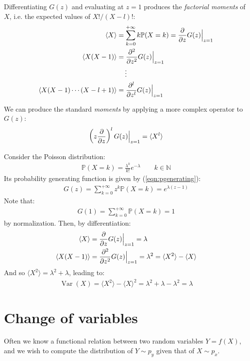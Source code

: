 \documentclass[../template.tex]{subfiles}
\begin{document}
Differentiating $G(z)$ and evaluating at $z=1$ produces the \textit{factorial moments} of $X$, i.e. the expected values of $X!/(X-l)!$:
\begin{align*}
    \langle X \rangle &= \sum_{k=0}^{+\infty} k \mathbb{P}(X=k) = \pdv{z} G(z)\Big|_{z=1} \\
    \langle X(X-1) \rangle &= \pdv[2]{z} G(z)\Big|_{z =1}\\
    \vdots \span\\
    \langle X(X-1)\cdots (X-l+1) \rangle &= \pdv[l]{z} G(z)\Big|_{z=1}
\end{align*} 

We can produce the standard \textit{moments} by applying a more complex operator to $G(z)$:
\begin{align*}
    \left(z \pdv{z}\right)^l G(z) \Big|_{z=1} = \langle X^l \rangle
\end{align*} 

\begin{example}
    Consider the Poisson distribution:
    \begin{align*}
        \mathbb{P}(X=k) = \frac{\lambda^k}{k!} e^{-\lambda} \qquad k \in \mathbb{N} 
    \end{align*}
    Its probability generating function is given by (\ref{eqn:pgenerating}):
    \begin{align*}
        G(z) = \sum_{k=0}^{+\infty} z^k \mathbb{P}(X=k) = e^{\lambda (z-1)}
    \end{align*}
    Note that:
    \begin{align*}
        G(1) = \sum_{k=0}^{+\infty} \mathbb{P}(X=k) = 1
    \end{align*}
    by normalization. Then, by differentiation:
    \begin{align*}
        \langle X \rangle &=\pdv{z} G(z)\Big|_{z=1} = \lambda\\
        \langle X(X-1) \rangle &= \pdv[2]{z} G(z)\Big|_{z =1} = \lambda^2 = \langle X^2 \rangle  -\langle  X \rangle
    \end{align*}
    And so $\langle X^2 \rangle = \lambda^2 + \lambda$, leading to:
    \begin{align*}
        \operatorname{Var}(X) = \langle X^2 \rangle - \langle X \rangle^2 = \lambda^2 + \lambda - \lambda^2 = \lambda
    \end{align*} 
\end{example}

\section{Change of variables}
Often we know a functional relation between two random variables $Y= f(X)$, and we wish to compute the distribution of $Y \sim p_y$ given that of $X \sim p_x$.
\end{document}
